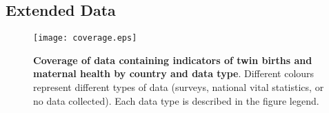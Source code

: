 \documentclass{nature}
\begin{document}
\begin{linenumbers}
\clearpage
\setcounter{figure}{0}
\setcounter{table}{0}
\renewcommand{\tablename}{Extended Data Table}
\renewcommand{\thetable}{E\arabic{table}}
\renewcommand{\figurename}{Extended Data Figure}
\renewcommand{\thefigure}{E\arabic{figure}}
\section{Extended Data}
\begin{spacing}{1}

\begin{figure}[htpb!]
\texttt{[image: coverage.eps]}
\caption{\textbf{Coverage of data containing indicators of twin births and maternal health by country and data type}. {\footnotesize  Different colours represent different types of data (surveys, national vital statistics, or no data collected).  Each data type is described in the figure legend.}}
\label{fig:twincoverage}
\end{figure}


\end{spacing}
\end{linenumbers}
\end{document}
